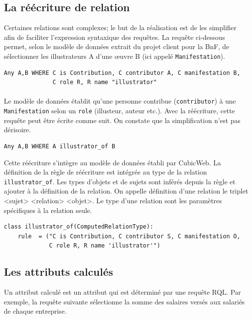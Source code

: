 \documentclass {report}
\begin{document}
\subsection{La réécriture de relation}
Certaines relations sont complexes; le but de la réalisation est de les simplifier afin de faciliter l'expression syntaxique des requêtes. La requête ci-dessous permet, selon le modèle de données extrait du projet client pour la BnF, de sélectionner les illustrateurs A d'une œuvre B (ici appelé \verb+Manifestation+).

\renewcommand{\lstlistingname}{Requête}
\begin{lstlisting}[caption= sélection des illustrateurs d'une œeuvre donnée]
Any A,B WHERE C is Contribution, C contributor A, C manifestation B,
              C role R, R name "illustrator"
\end{lstlisting}
\paragraph{}
Le modèle de données établit qu'une personne contribue (\verb+contributor+) à une \verb+Manifestation+ selon un \verb+role+ (illusteur, auteur etc.). Avec la réécriture, cette requête peut être écrite comme suit. On constate que la simplification n'est pas dérisoire.
\renewcommand{\lstlistingname}{Requête avec réécriture}
\begin{lstlisting}[caption= requête RQL réécrite]
Any A,B WHERE A illustrator_of B
\end{lstlisting}

Cette réécriture s'intègre au modèle de données établi par CubicWeb. La définition de la règle de réécriture est intégrée au type de la relation \verb+illustrator_of+. Les types d'objets et de sujets sont inférés depuis la règle et ajouter à la définition de la relation. On appelle définition d'une relation le triplet <sujet> <relation> <objet>. Le type d'une relation sont les paramètres spécifiques à la relation seule.

\renewcommand{\lstlistingname}{Schéma}
\begin{lstlisting}[caption= Relation utilisant une règle de réécriture]
class illustrator_of(ComputedRelationType):
    rule  = ("C is Contribution, C contributor S, C manifestation O,
             C role R, R name 'illustrator'")
\end{lstlisting}

\subsection{Les attributs calculés}
Un attribut calculé est un attribut qui est déterminé par une requête RQL. Par exemple, la requête suivante sélectionne la somme des salaires versés aux salariés de chaque entreprise.
\end{document}
